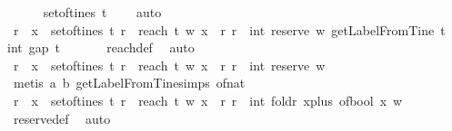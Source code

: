 \begin{isabellebody}
\ \ \ \ \isamarkupfalse%
\ {\isacartoucheopen}set{\isacharunderscore}of{\isacharunderscore}tines\ t\ {\isacharequal}\ {\isacharbraceleft}{\isacharbrackleft}{\isacharbrackright}{\isacharbraceright}{\isacartoucheclose}\ \isamarkupfalse%
\ auto\isanewline
\ \ \isamarkupfalse%
\ {\isachardoublequoteopen}{\isacharbraceleft}r{\isachardot}\ {\isasymexists}\ x\ {\isasymin}\ set{\isacharunderscore}of{\isacharunderscore}tines\ t{\isachardot}\ r\ {\isacharequal}\ reach\ t\ w\ x{\isacharbraceright}\ {\isacharequal}\ {\isacharbraceleft}r{\isachardot}\ r\ {\isacharequal}\ int\ {\isacharparenleft}reserve\ w\ {\isacharparenleft}getLabelFromTine\ t\ {\isacharbrackleft}{\isacharbrackright}{\isacharparenright}{\isacharparenright}\ {\isacharminus}\ int\ {\isacharparenleft}gap\ t\ {\isacharbrackleft}{\isacharbrackright}{\isacharparenright}{\isacharbraceright}{\isachardoublequoteclose}\isanewline
\ \ \ \ \isamarkupfalse%
\ reach{\isacharunderscore}def\ \isamarkupfalse%
\ auto\isanewline
\ \ \isamarkupfalse%
\ {\isachardoublequoteopen}{\isacharbraceleft}r{\isachardot}\ {\isasymexists}\ x\ {\isasymin}\ set{\isacharunderscore}of{\isacharunderscore}tines\ t{\isachardot}\ r\ {\isacharequal}\ reach\ t\ w\ x{\isacharbraceright}\ {\isacharequal}\ {\isacharbraceleft}r{\isachardot}\ r\ {\isacharequal}\ int\ {\isacharparenleft}reserve\ w\ {\isacharbrackleft}{\isacharbrackright}{\isacharparenright}\ {\isacharminus}\ {}{\isacharbraceright}{\isachardoublequoteclose}\isanewline
\ \ \ \ \isamarkupfalse%
\ {\isacharparenleft}metis\ a\ b\ getLabelFromTine{\isachardot}simps{\isacharparenleft}{}{\isacharparenright}\ of{\isacharunderscore}nat{\isacharunderscore}{}{\isacharparenright}\isanewline
\ \ \isamarkupfalse%
\ {\isachardoublequoteopen}{\isacharbraceleft}r{\isachardot}\ {\isasymexists}\ x\ {\isasymin}\ set{\isacharunderscore}of{\isacharunderscore}tines\ t{\isachardot}\ r\ {\isacharequal}\ reach\ t\ w\ x{\isacharbraceright}\ {\isacharequal}\ {\isacharbraceleft}r{\isachardot}\ r\ {\isacharequal}\ int\ {\isacharparenleft}foldr\ {\isacharparenleft}{\isasymlambda}x{\isachardot}{\isacharparenleft}plus\ {\isacharparenleft}of{\isacharunderscore}bool\ x{\isacharparenright}{\isacharparenright}{\isacharparenright}\ w\ {}{\isacharparenright}{\isacharbraceright}{\isachardoublequoteclose}\isanewline
\ \ \ \ \isamarkupfalse%
\ reserve{\isacharunderscore}def\ \isamarkupfalse%
\ auto\isanewline

\end{isabellebody}

